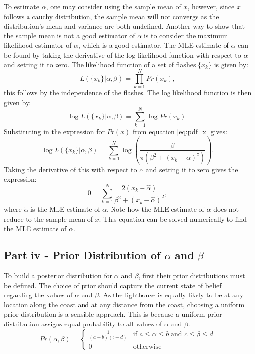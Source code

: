 \documentclass[11pt]{article}
\begin{document}
To estimate $\alpha$, one may consider using the sample mean of $x$, however, since $x$ follows a cauchy distribution, the sample mean will not converge as the distribution's mean and variance are both undefined. Another way to show that the sample mean is not a good estimator of $\alpha$ is to consider the maximum likelihood estimator of $\alpha$, which is a good estimator. The MLE estimate of $\alpha$ can be found by taking the derivative of the log likelihood function with respect to $\alpha$ and setting it to zero. The likelihood function of a set of flashes $\{x_k\}$ is given by:
\[
L(\{x_k\}|\alpha,\beta) = \prod_{k=1}^{N} Pr(x_k),
\] this follows by the independence of the flashes. The log likelihood function is then given by:
\[
\log L(\{x_k\}|\alpha,\beta) = \sum_{k=1}^{N} \log Pr(x_k).
\] Substituting in the expression for $Pr(x)$ from equation \ref{eq:pdf_x} gives:
\[
\log L(\{x_k\}|\alpha,\beta) = \sum_{k=1}^{N} \log \left( \frac{\beta}{\pi(\beta^2 + (x_k-\alpha)^2)} \right).
\]
Taking the derivative of this with respect to $\alpha$ and setting it to zero gives the expression:
\[
0 = \sum_{k=1}^{N} \frac{2(x_k-\hat\alpha)}{\beta^2 + (x_k - \hat\alpha)^2},
\] where $\hat\alpha$ is the MLE estimate of $\alpha$. Note how the MLE estimate of $\alpha$ does not reduce to the sample mean of $x$. This equation can be solved numerically to find the MLE estimate of $\alpha$.

\subsection{Part iv - Prior Distribution of $\alpha$ and $\beta$}

To build a posterior distribution for $\alpha$ and $\beta$, first their prior distributions must be defined. The choice of prior should capture the current state of belief regarding the values of $\alpha$ and $\beta$. As the lighthouse is equally likely to be at any location along the coast and at any distance from the coast, choosing a uniform prior distribution is a sensible approach. This is because a uniform prior distribution assigns equal probability to all values of $\alpha$ and $\beta$. 
\begin{equation}
Pr(\alpha, \beta) = \left\{
    \begin{array}{ll}
        \frac{1}{(a-b)(c-d)} & \text{if }  a \leq \alpha \leq b \text{ and } c \leq \beta \leq d  \\
        0 & \text{otherwise}
    \end{array}
\right.
\end{equation}
\end{document}
